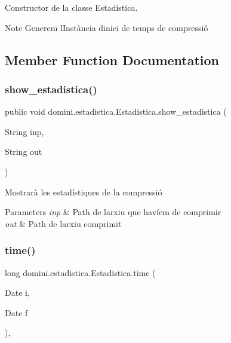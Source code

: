 Constructor de la classe Estadística. 

\begin{DoxyNote}{Note}
Generem l\textquotesingle{}Instància d\textquotesingle{}inici de temps de compressió 
\end{DoxyNote}


\subsection{Member Function Documentation}
\mbox{\label{classdomini_1_1estadistica_1_1Estadistica_a6cac6971be817fd985afb8f3b6725464}} 
\subsubsection{\texorpdfstring{show\+\_\+estadistica()}{show\_estadistica()}}
{\footnotesize\ttfamily public void domini.\+estadistica.\+Estadistica.\+show\+\_\+estadistica (\begin{DoxyParamCaption}\item[{String}]{inp,  }\item[{String}]{out }\end{DoxyParamCaption})\hspace{0.3cm}{\ttfamily [inline]}}



Mostrarà les estadístiques de la compressió 


\begin{DoxyParams}{Parameters}
{\em inp} & Path de l\textquotesingle{}arxiu que havíem de comprimir \\
\hline
{\em out} & Path de l\textquotesingle{}arxiu comprimit \\
\hline
\end{DoxyParams}
\mbox{\label{classdomini_1_1estadistica_1_1Estadistica_a7587e21e3f7f177afe0dd36483c8fe5d}} 
\subsubsection{\texorpdfstring{time()}{time()}}
{\footnotesize\ttfamily long domini.\+estadistica.\+Estadistica.\+time (\begin{DoxyParamCaption}\item[{Date}]{i,  }\item[{Date}]{f }\end{DoxyParamCaption})\hspace{0.3cm}{\ttfamily [inline]}, {\ttfamily [private]}}



